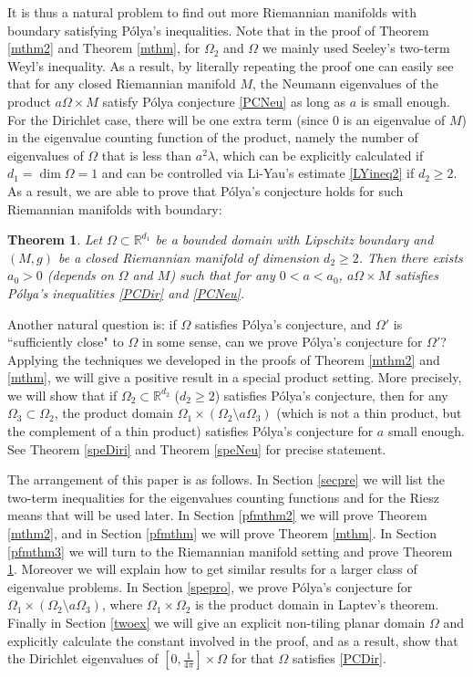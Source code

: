 \documentclass[11pt,letterpaper]{amsart}
\numberwithin{equation}{section}
\theoremstyle{plain}
\newtheorem{theorem}{Theorem}[section]
\theoremstyle{plain}
\numberwithin{equation}{section}
\theoremstyle{remark}
\begin{document}
	It is thus a natural problem to find out more Riemannian manifolds with boundary satisfying P\'olya's inequalities. Note that in the proof of Theorem \ref{mthm2} and Theorem \ref{mthm}, for $\Omega_2$ and $\Omega$ we mainly used Seeley's two-term Weyl's inequality. As a result, by literally repeating the proof one can easily see  that for any   closed Riemannian manifold  $M$, the Neumann eigenvalues of the product $a\Omega \times M$  satisfy P\'olya conjecture \eqref{PCNeu} as long as $a$ is small enough. For the Dirichlet case, there will be one extra term (since $0$ is an eigenvalue of $M$) in the eigenvalue counting function of the product, namely the number of eigenvalues of $\Omega$ that is less than $a^2\lambda$, which can be explicitly calculated if $d_1=\dim \Omega=1$ and can be controlled via Li-Yau's estimate \eqref{LYineq2} if $d_2 \ge 2$. As a result, we are able to prove that P\'olya's conjecture holds  for such Riemannian manifolds with boundary:   
	\begin{theorem}\label{mthm3}
		Let $\Omega\subset \mathbb R^{d_1}$ be a bounded domain with Lipschitz boundary and $(M,g)$ be a closed Riemannian manifold of dimension $d_2\ge 2$. Then there exists $a_0>0$ (depends on $\Omega$ and $M$) such that for any $0<a<a_0$, $a\Omega\times M$ satisfies P\'olya's inequalities \eqref{PCDir} and \eqref{PCNeu}.
	\end{theorem}
	
	Another natural question is: if $\Omega$ satisfies P\'olya's conjecture, and $\Omega'$ is ``sufficiently close" to $\Omega$ in some sense, can we prove P\'olya's conjecture for  $\Omega'$? Applying the techniques we developed in the proofs of Theorem \ref{mthm2} and \ref{mthm}, we will give a positive result in a special product setting. More precisely, we will show that if    $\Omega_2 \subset \mathbb R^{d_2}$ ($d_2 \ge 2$) satisfies P\'olya's conjecture, then  for any  $\Omega_3 \subset \Omega_2$, the product domain $\Omega_1 \times (\Omega_2 \setminus a \Omega_3)$ (which is not a thin product, but the complement of a thin product) satisfies P\'olya's conjecture for $a$ small enough. See Theorem \ref{speDiri} and Theorem \ref{speNeu} for precise statement.  
	
	
	The arrangement of this paper is as follows. In Section \ref{secpre} we will list the two-term inequalities for the eigenvalues counting functions and for the Riesz means that will be used later. In Section \ref{pfmthm2} we will prove Theorem \ref{mthm2}, and in Section \ref{pfmthm} we will prove Theorem \ref{mthm}. In Section \ref{pfmthm3} we will turn to the Riemannian manifold setting and prove Theorem \ref{mthm3}. Moreover we will explain how to get similar results for a larger class of eigenvalue problems. 
	In Section \ref{spepro}, we prove P\'olya's conjecture for $\Omega_1 \times (\Omega_2 \setminus a \Omega_3)$, where  $\Omega_1 \times \Omega_2$ is the product domain in Laptev's theorem. 
	Finally in Section \ref{twoex} we will give an explicit non-tiling planar domain $\Omega$ and explicitly calculate the constant involved in the proof,  and as a result, show that the Dirichlet eigenvalues of $[0,\frac{1}{4\pi}]\times \Omega$ for that $\Omega$ satisfies \eqref{PCDir}. 
	
\end{document}
